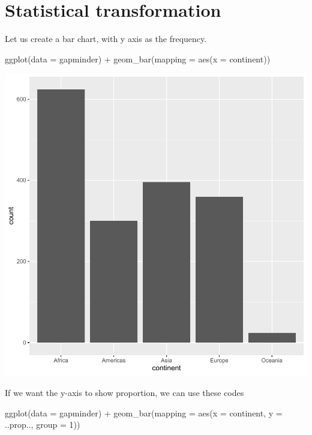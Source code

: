 \documentclass[
]{book}
\makeatletter
\newenvironment{Shaded}{\begin{snugshade}}{\end{snugshade}}
\newcommand{\AttributeTok}[1]{\textcolor[rgb]{0.61,0.61,0.61}{#1}}
\newcommand{\DecValTok}[1]{\textcolor[rgb]{0.06,0.06,0.06}{#1}}
\newcommand{\FunctionTok}[1]{\textcolor[rgb]{0,0,0}{#1}}
\newcommand{\NormalTok}[1]{#1}
\newcommand{\SpecialCharTok}[1]{\textcolor[rgb]{0,0,0}{#1}}
\newenvironment{kframe}{%
\medskip{}
\setlength{\fboxsep}{.8em}
 \def\at@end@of@kframe{}%
 \ifinner\ifhmode%
  \def\at@end@of@kframe{\end{minipage}}%
  \begin{minipage}{\columnwidth}%
 \fi\fi%
 \def\FrameCommand##1{\hskip\@totalleftmargin \hskip-\fboxsep
 \colorbox{shadecolor}{##1}\hskip-\fboxsep
     \hskip-\linewidth \hskip-\@totalleftmargin \hskip\columnwidth}%
 \MakeFramed {\advance\hsize-\width
   \@totalleftmargin\z@ \linewidth\hsize
   \@setminipage}}%
 {\par\unskip\endMakeFramed%
 \at@end@of@kframe}
\renewenvironment{Shaded}{\begin{kframe}}{\end{kframe}}
\makeatother
\begin{document}
\hypertarget{statistical-transformation}{%
\section{Statistical transformation}\label{statistical-transformation}}

Let us create a bar chart, with y axis as the frequency.

\begin{Shaded}
\begin{Highlighting}[]
\FunctionTok{ggplot}\NormalTok{(}\AttributeTok{data =}\NormalTok{ gapminder) }\SpecialCharTok{+}
  \FunctionTok{geom\_bar}\NormalTok{(}\AttributeTok{mapping =} \FunctionTok{aes}\NormalTok{(}\AttributeTok{x =}\NormalTok{ continent))}
\end{Highlighting}
\end{Shaded}

\begin{center}\includegraphics[width=0.7\linewidth,keepaspectratio]{Multivariable_Data_Analysis_files/figure-latex/unnamed-chunk-34-1} \end{center}

If we want the y-axis to show proportion, we can use these codes

\begin{Shaded}
\begin{Highlighting}[]
\FunctionTok{ggplot}\NormalTok{(}\AttributeTok{data =}\NormalTok{ gapminder) }\SpecialCharTok{+}
  \FunctionTok{geom\_bar}\NormalTok{(}\AttributeTok{mapping =} \FunctionTok{aes}\NormalTok{(}\AttributeTok{x =}\NormalTok{ continent, }\AttributeTok{y =}\NormalTok{ ..prop..,}
                         \AttributeTok{group =} \DecValTok{1}\NormalTok{))}
\end{Highlighting}
\end{Shaded}
\end{document}
